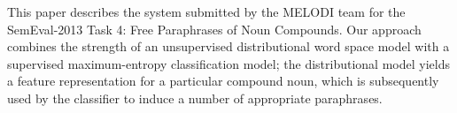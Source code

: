 This paper describes the system submitted by the MELODI team for the SemEval-2013 Task 4: Free Paraphrases of Noun Compounds. Our approach combines
 the strength of an unsupervised distributional word space model with a
 supervised maximum-entropy classification model; the distributional model
 yields a feature representation for a particular compound noun, which is
 subsequently used by the classifier to induce a number of appropriate
 paraphrases.

